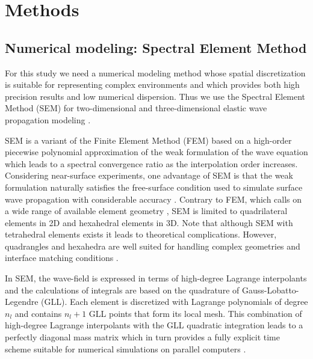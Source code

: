 \documentclass[paper,extra]{gji} %
\begin{document}
\section{Methods}

\subsection{Numerical modeling: Spectral Element Method}

\noindent For this study we need a numerical modeling method whose spatial discretization is suitable for representing complex environments and which provides both high precision results and low numerical dispersion. Thus we use the Spectral Element Method (SEM) for two-dimensional and three-dimensional elastic wave propagation modeling \citep{Komatitsch_SEM_1998,Komatitsch_ISM_1999,Komatitsch_SEM_2005,Festa_PML_2005}. 

\noindent SEM is a variant of the Finite Element Method (FEM) \citep{Lysmer_FEM_1972,Seron_FEM_1990,Hulbert_FEM_1990,Tromp_SEM_2008} based on a high-order piecewise polynomial approximation of the weak formulation of the wave equation which leads to a spectral convergence ratio as the interpolation order increases. Considering near-surface experiments, one advantage of SEM is that the weak formulation naturally satisfies the free-surface condition used to simulate surface wave propagation with considerable accuracy \citep{komatitsch1998spectral,komatitsch1999spectral,Komatitsch_SEM_2005}. Contrary to FEM, which calls on a wide range of available element geometry \citep{dhatt1984finite}, SEM is limited to quadrilateral elements in 2D and hexahedral elements in 3D. Note that although SEM with tetrahedral elements exists \citep{komatitsch2001wave} it leads to theoretical complications. However, quadrangles and hexahedra are well suited for handling complex geometries and interface matching conditions \citep{Cristini_SEM_2012}. 

\noindent In SEM, the wave-field is expressed in terms of high-degree Lagrange interpolants and the calculations of integrals are based on the quadrature of Gauss-Lobatto-Legendre (GLL). Each element is discretized with Lagrange polynomials of degree $n_{l}$ and contains $n_{l}+1$ GLL points that form its local mesh. This combination of high-degree Lagrange interpolants with the GLL quadratic integration leads to a perfectly diagonal mass matrix which in turn provides a fully explicit time scheme suitable for numerical simulations on parallel computers \citep{komatitsch1998spectral,komatitsch1999spectral}.
\end{document}

